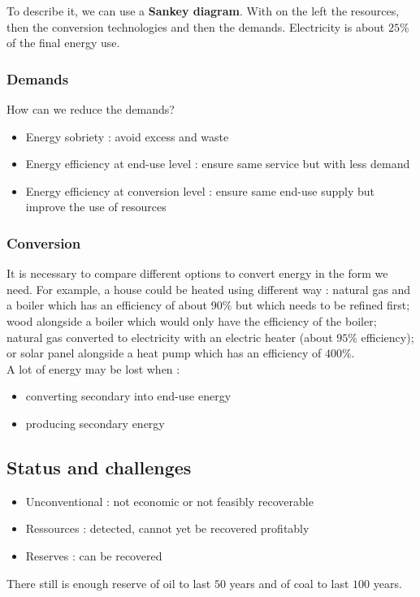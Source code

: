 \documentclass[../main.tex]{subfiles}
\begin{document}
To describe it, we can use a \textbf{Sankey diagram}. With on the left the resources, then the conversion technologies and then the demands. Electricity is about $25\%$ of the final energy use. \\

\subsubsection{Demands}
How can we reduce the demands? \begin{itemize}
    \item Energy sobriety : avoid excess and waste\\
    \item Energy efficiency at end-use level : ensure same service but with less demand\\
    \item Energy efficiency at conversion level : ensure same end-use supply but improve the use of resources\\
\end{itemize}

\subsubsection{Conversion}
It is necessary to compare different options to convert energy in the form we need. 
For example, a house could be heated using different way : natural gas and a boiler which has an efficiency of about $90\%$ but which needs to be refined first; wood alongside a boiler which would only have the efficiency of the boiler; natural gas converted to electricity with an electric heater (about $95\%$ efficiency); or solar panel alongside a heat pump which has an efficiency of $400\%$.\\

A lot of energy may be lost when : \begin{itemize}
    \item converting secondary into end-use energy\\
    \item producing secondary energy\\
\end{itemize}

\subsection{Status and challenges}
\begin{itemize}
    \item Unconventional : not economic or not feasibly recoverable
    \item Ressources : detected, cannot yet be recovered profitably
    \item Reserves : can be recovered
\end{itemize}
There still is enough reserve of oil to last $50$ years and of coal to last $100$ years. \\
\end{document}
